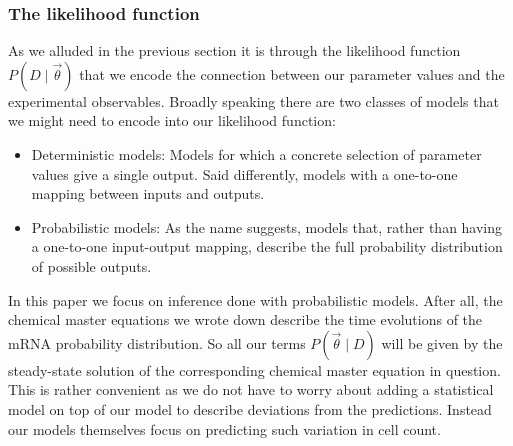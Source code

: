 \subsubsection{The likelihood function}

As we alluded in the previous section it is through the likelihood function 
$P(D \mid \vec{\theta})$ that we encode the connection between our parameter 
values and the experimental observables. Broadly speaking there are two classes
of models that we might need to encode into our likelihood function:
\begin{itemize}
        \item Deterministic models: Models for which a concrete selection of
        parameter values give a single output. Said differently, models 
        with a one-to-one mapping between inputs and outputs.
        \item Probabilistic models: As the name suggests, models that, rather than
        having a one-to-one input-output mapping, describe the full
        probability distribution of possible outputs.
\end{itemize}
In this paper we focus on inference done with probabilistic models. After all,
the chemical master equations we wrote down describe the time evolutions of the
mRNA probability distribution. So all our terms $P(\vec{\theta} \mid D)$ will be
given by the steady-state solution of the corresponding chemical master equation
in question. This is rather convenient as we do not have to worry about adding a
statistical model on top of our model to describe deviations from the
predictions. Instead our models themselves focus on predicting such variation
in cell count.

